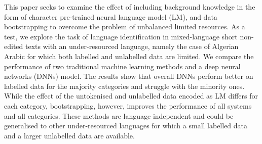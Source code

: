 This paper seeks to examine the effect of including background knowledge in the form of character pre-trained neural language model (LM), and data bootstrapping to overcome the problem of unbalanced limited resources. As a test, we explore the task of language identification in mixed-language short non-edited texts with an under-resourced language, namely the case of Algerian Arabic for which both labelled and unlabelled data are limited. We compare the performance of two traditional machine learning methods and a deep neural networks (DNNs) model. The results show that overall DNNs perform better on labelled data for the majority categories and struggle with the minority ones. While the effect of the untokenised and unlabelled data encoded as LM differs for each category, bootstrapping, however, improves the performance of all systems and all categories. These methods are language independent and could be generalised to other under-resourced languages for which a small labelled data and a larger unlabelled data are available.
